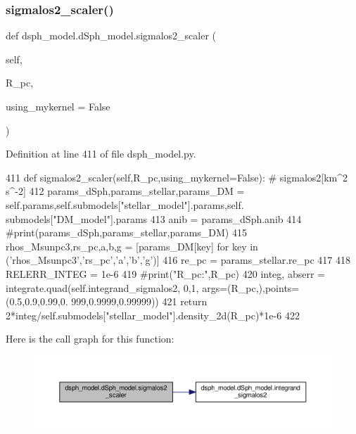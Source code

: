 \subsubsection{\texorpdfstring{sigmalos2\+\_\+scaler()}{sigmalos2\_scaler()}}
{\footnotesize\ttfamily def dsph\+\_\+model.\+d\+Sph\+\_\+model.\+sigmalos2\+\_\+scaler (\begin{DoxyParamCaption}\item[{}]{self,  }\item[{}]{R\+\_\+pc,  }\item[{}]{using\+\_\+mykernel = {\ttfamily False} }\end{DoxyParamCaption})}



Definition at line 411 of file dsph\+\_\+model.\+py.


\begin{DoxyCode}
411     \textcolor{keyword}{def }sigmalos2\_scaler(self,R\_pc,using\_mykernel=False): \textcolor{comment}{# sigmalos2[km^2 s^-2] }
412         params\_dSph,params\_stellar,params\_DM = self.params,self.submodels[\textcolor{stringliteral}{"stellar\_model"}].params,self.
      submodels[\textcolor{stringliteral}{"DM\_model"}].params
413         anib = params\_dSph.anib
414         \textcolor{comment}{#print(params\_dSph,params\_stellar,params\_DM)}
415         rhos\_Msunpc3,rs\_pc,a,b,g = [params\_DM[key] \textcolor{keywordflow}{for} key \textcolor{keywordflow}{in} (\textcolor{stringliteral}{'rhos\_Msunpc3'},\textcolor{stringliteral}{'rs\_pc'},\textcolor{stringliteral}{'a'},\textcolor{stringliteral}{'b'},\textcolor{stringliteral}{'g'})]
416         re\_pc = params\_stellar.re\_pc
417 
418         RELERR\_INTEG = 1e-6
419         \textcolor{comment}{#print("R\_pc:",R\_pc)}
420         integ, abserr =  integrate.quad(self.integrand\_sigmalos2, 0,1, args=(R\_pc,),points=(0.5,0.9,0.99,0.
      999,0.9999,0.99999))
421         \textcolor{keywordflow}{return} 2*integ/self.submodels[\textcolor{stringliteral}{"stellar\_model"}].density\_2d(R\_pc)*1e-6
422     
\end{DoxyCode}
Here is the call graph for this function\+:
\nopagebreak
\begin{figure}[H]
\begin{center}
\leavevmode
\includegraphics[width=350pt]{d0/d25/classdsph__model_1_1dSph__model_a05b988f7553121226a4d08369c44b4fa_cgraph}
\end{center}
\end{figure}

